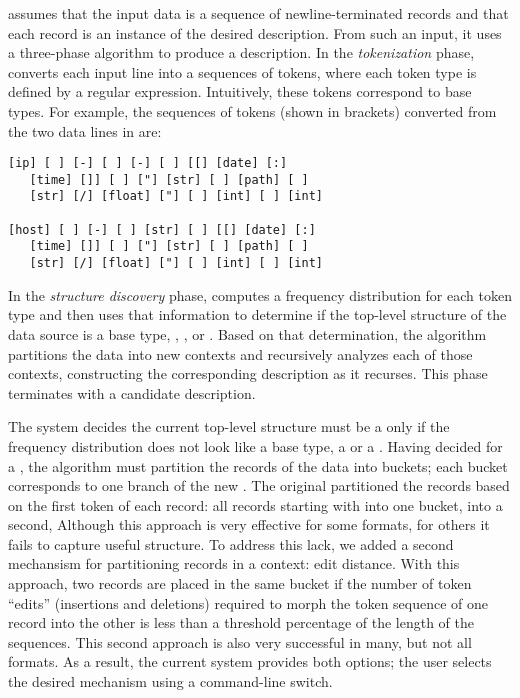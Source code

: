 \learnpads{} assumes that the input data is a sequence of
newline-terminated records and that each record is an instance of the
desired description.  From such an input, it uses a three-phase
algorithm to produce a description.  In the {\em tokenization} phase,
\learnpads{} converts each input line into a sequences of tokens,
where each token type is defined by a regular expression.
Intuitively, these tokens correspond to \pads{} base types.
For example, the sequences of
tokens (shown in brackets) converted from the two data lines 
in  are:

{\small
\begin{verbatim}
[ip] [ ] [-] [ ] [-] [ ] [[] [date] [:] 
   [time] []] [ ] ["] [str] [ ] [path] [ ] 
   [str] [/] [float] ["] [ ] [int] [ ] [int]

[host] [ ] [-] [ ] [str] [ ] [[] [date] [:] 
   [time] []] [ ] ["] [str] [ ] [path] [ ] 
   [str] [/] [float] ["] [ ] [int] [ ] [int]
\end{verbatim}
}

In the {\em structure discovery} phase, \learnpads{} computes a
frequency distribution for each token type and then uses that
information to determine if the top-level structure of the data source
is a base type, , , or .  Based on
that determination, the algorithm partitions the data into new
contexts and recursively analyzes each of those contexts, constructing
the corresponding description as it recurses.  This phase terminates
with a candidate description.  

The \learnpads{} system decides the current top-level structure must
be a  only if the frequency distribution does not look like
a base type, a  or a .  Having decided for a
, the algorithm must partition the records of the data into
buckets; each bucket corresponds to one branch of the new
.  The original \learnpads{} partitioned the records
based on the first token of each record: all records starting with
 into one bucket,  into a second, \etc{}  
Although this approach is very effective for some formats, for others
it fails to capture useful structure.  To address this lack, we added
a second mechansism for partitioning records in a 
context: edit distance.  With this approach, two records are placed in
the same bucket if the number of token ``edits'' (insertions and
deletions) required to morph the token sequence of one record into the
other is less than a threshold percentage of the length of the
sequences.   This second approach is also very successful in many, but
not all formats.  As a result, the current \learnpads{} system
provides both options; the user selects the desired mechanism using a
command-line switch.


